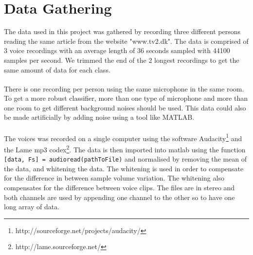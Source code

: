 
\section{Data Gathering}
The data used in this project was gathered by recording three different persons reading the same article from the website "www.tv2.dk".
The data is comprised of 3 voice recordings with an average length of 36 seconds sampled with 44100 samples per second.
We trimmed the end of the 2 longest recordings to get the same amount of data for each class.
\\\ \\
There is one recording per person using the same microphone in the same room.
To get a more robust classifier, more than one type of microphone and more than one room to get different background noises should be used.
This data could also be made artificially by adding noise using a tool like MATLAB.
\\\ \\
The voices was recorded on a single computer using the software Audacity\footnote{http://sourceforge.net/projects/audacity/} and the Lame mp3 codex\footnote{http://lame.sourceforge.net/}.
The data is then imported into matlab using the function \texttt{[data, Fs] = audioread(pathToFile)} and normalised by removing the mean of the data, and whitening the data.
The whitening is used in order to compensate for the difference in between sample volume variation. The whitening also compensates for the difference between voice clips.
The files are in stereo and both channels are used by appending one channel to the other so to have one long array of data.

